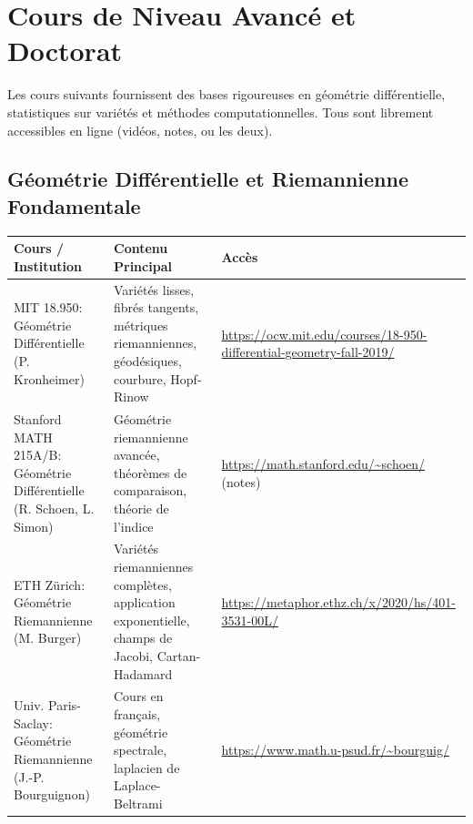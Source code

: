 \documentclass[11pt,a4paper]{article}
\begin{document}
\section{Cours de Niveau Avancé et Doctorat}

Les cours suivants fournissent des bases rigoureuses en géométrie différentielle, statistiques sur variétés et méthodes computationnelles. Tous sont librement accessibles en ligne (vidéos, notes, ou les deux).

\subsection{Géométrie Différentielle et Riemannienne Fondamentale}
\begin{longtable}{@{}p{3.2cm}p{5.5cm}p{5.3cm}@{}}
\toprule
\textbf{Cours / Institution} & \textbf{Contenu Principal} & \textbf{Accès} \\
\midrule
MIT 18.950: Géométrie Différentielle (P. Kronheimer) & Variétés lisses, fibrés tangents, métriques riemanniennes, géodésiques, courbure, Hopf-Rinow & \url{https://ocw.mit.edu/courses/18-950-differential-geometry-fall-2019/} \\
Stanford MATH 215A/B: Géométrie Différentielle (R. Schoen, L. Simon) & Géométrie riemannienne avancée, théorèmes de comparaison, théorie de l'indice & \url{https://math.stanford.edu/~schoen/} (notes) \\
ETH Zürich: Géométrie Riemannienne (M. Burger) & Variétés riemanniennes complètes, application exponentielle, champs de Jacobi, Cartan-Hadamard & \url{https://metaphor.ethz.ch/x/2020/hs/401-3531-00L/} \\
Univ. Paris-Saclay: Géométrie Riemannienne (J.-P. Bourguignon) & Cours en français, géométrie spectrale, laplacien de Laplace-Beltrami & \url{https://www.math.u-psud.fr/~bourguig/} \\
\bottomrule
\end{longtable}
\end{document}

